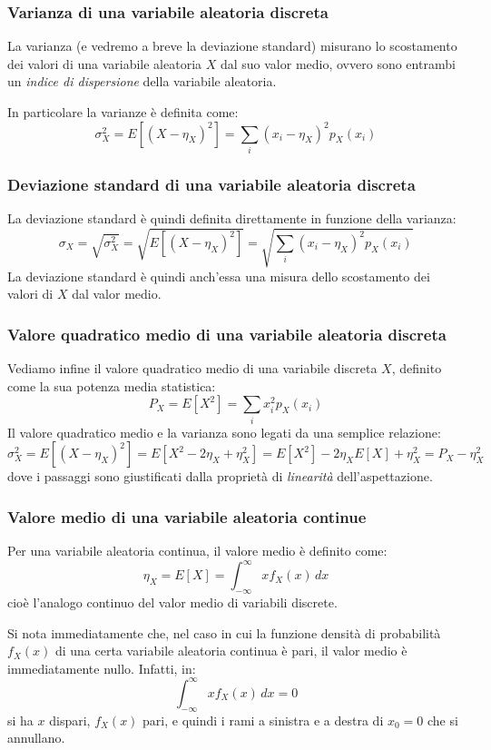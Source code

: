 \documentclass[a4paper,11pt]{article}
\begin{document}
\subsubsection{Varianza di una variabile aleatoria discreta}
La varianza (e vedremo a breve la deviazione standard) misurano lo scostamento dei valori di una variabile aleatoria $X$ dal suo valor medio, ovvero sono entrambi un \textit{indice di dispersione} della variabile aleatoria.

In particolare la varianze è definita come:
$$
\sigma^2_X = E \left[ (X - \eta_X)^2 \right] = \sum_i (x_i - \eta_X)^2 p_X (x_i)
$$

\subsubsection{Deviazione standard di una variabile aleatoria discreta}
La deviazione standard è quindi definita direttamente in funzione della varianza:
$$
\sigma_X = \sqrt{\sigma^2_X} = \sqrt{ E \left[ (X - \eta_X)^2 \right] } = \sqrt{ \sum_i (x_i - \eta_X)^2 p_X (x_i) }
$$
La deviazione standard è quindi anch'essa una misura dello scostamento dei valori di $X$ dal valor medio.

\subsubsection{Valore quadratico medio di una variabile aleatoria discreta}
Vediamo infine il valore quadratico medio di una variabile discreta $X$, definito come la sua potenza media statistica:
$$
P_X = E\left[ X^2 \right] = \sum_i x_i^2 p_X(x_i)
$$
Il valore quadratico medio e la varianza sono legati da una semplice relazione:
$$
\sigma^2_X = E \left[ (X - \eta_X)^2 \right] = E \left[ X^2 - 2\eta_X + \eta_X^2 \right] = E \left[ X^2 \right] - 2 \eta_X E \left[ X \right] + \eta_X^2 = P_X - \eta_X^2
$$
dove i passaggi sono giustificati dalla proprietà di \textit{linearità} dell'aspettazione. 

\subsubsection{Valore medio di una variabile aleatoria continue}
Per una variabile aleatoria continua, il valore medio è definito come:
$$
\eta_X = E\left[X\right] = \int_{-\infty}^{\infty} x f_X(x) \, dx
$$
cioè l'analogo continuo del valor medio di variabili discrete.

Si nota immediatamente che, nel caso in cui la funzione densità di probabilità $f_X(x)$ di una certa variabile aleatoria continua è pari, il valor medio è immediatamente nullo. Infatti, in:
$$
\int_{-\infty}^{\infty} x f_X(x) \, dx = 0
$$
si ha $x$ dispari, $f_X(x)$ pari, e quindi i rami a sinistra e a destra di $x_0 = 0$ che si annullano.
\end{document}
